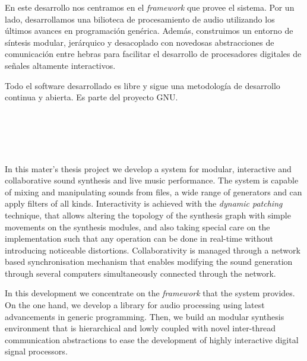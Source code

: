 En este desarrollo nos centramos en el \emph{framework} que provee el
sistema. Por un lado, desarrollamos una bilioteca  de
procesamiento de audio utilizando los últimos avances en programación
genérica. Además, construimos un entorno de síntesis modular,
jerárquico y desacoplado con novedosas abstracciones de comunicación
entre hebras para facilitar el desarrollo de procesadores digitales de
señales altamente interactivos.

Todo el software desarrollado es libre y sigue una metodología de
desarrollo continua y abierta. Es parte del proyecto GNU.


\clearpage
\thispagestyle{empty}
\begin{center}
{\large\bfseries \myTitle}\\
\end{center}
\begin{center}
\myName
\end{center}
\\
\vspace{0.7cm}

\\
In this mater's thesis project we develop a system for modular,
interactive and collaborative sound synthesis and live music
performance. The system is capable of mixing and manipulating sounds
from files, a wide range of generators and can apply filters of all
kinds. Interactivity is achieved with the \emph{dynamic patching}
technique, that allows altering the topology of the synthesis graph
with simple movements on the synthesis modules, and also taking
special care on the implementation such that any operation can be done
in real-time without introducing noticeable
distortions. Collaborativity is managed through a network based
synchronisation mechanism that enables modifying the sound generation
through several computers simultaneously connected through the
network.

In this development we concentrate on the \emph{framework} that the
system provides. On the one hand, we develop a library for audio
processing using latest advancements in generic programming. Then, we
build an modular synthesis environment that is hierarchical and lowly
coupled with novel inter-thread communication abstractions to ease the
development of highly interactive digital signal processors. 


